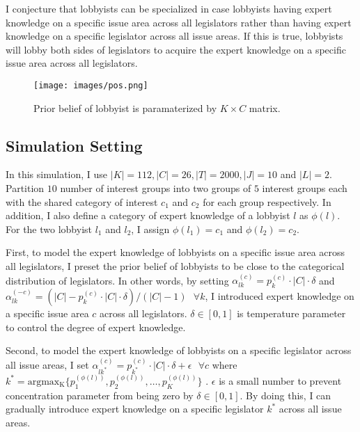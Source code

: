 \documentclass{article}
\begin{document}
I conjecture that lobbyists can be specialized 
in case lobbyists having 
expert knowledge on a specific issue area across all legislators
rather than having expert knowledge 
on a specific legislator across all issue areas.
If this is true, 
lobbyists will lobby both sides of legislators
to acquire 
the expert knowledge on a specific issue area
across all legislators.

\begin{figure}[h!]
    \centering
    \texttt{[image: images/pos.png]}
    \caption{Prior belief of lobbyist is paramaterized by $K \times C$ matrix.}
    \label{fig:mesh1}
\end{figure}



\subsection{Simulation Setting}

In this simulation, 
I use $|K|=112, |C|=26, |T|=2000, |J|=10$ and $|L|=2$. 
Partition $10$ number of interest groups 
into two groups of $5$ interest groups each
with the shared category of interest $c_1$ and $c_2$ 
for each group respectively.
In addition, I also define a category of expert knowledge of a lobbyist $l$ as 
$\phi(l)$. For the two lobbyist $l_1$ and $l_2$, I assign $\phi(l_1) = c_1$ and $\phi(l_2) = c_2$.

First, to model the expert knowledge of lobbyists 
on a specific issue area across all legislators,
I preset the prior belief of lobbyists to be close to the categorical distribution of legislators.
In other words, 
by setting $\alpha_{lk}^{(c)} = p_k^{(c)} \cdot |C| \cdot \delta $ and $\alpha_{lk}^{(-c)} = (|C| - p_k^{(c)} \cdot |C| \cdot \delta)/(|C|-1) \text{ } \forall k$, 
I introduced expert knowledge on a specific issue area $c$ across all legislators.
$\delta \in [0,1]$ is temperature parameter to control the degree of expert knowledge.

Second, to model the expert knowledge of lobbyists 
on a specific legislator across all issue areas,
I set $\alpha_{lk^*}^{(c)} = p_{k^*}^{(c)}\cdot |C| \cdot \delta + \epsilon \text{ } \forall c$ where $k^* = \operatorname{argmax_K}\{p_1^{(\phi(l))}, p_2^{(\phi(l))}, \hdots, p_K^{(\phi(l))}\}$ .
$\epsilon$ is a small number to prevent concentration parameter from being zero by $\delta \in [0,1]$.
By doing this, I can gradually introduce expert knowledge on a specific legislator $k^*$ across all issue areas.
\end{document}
